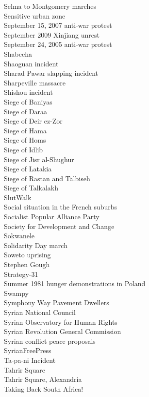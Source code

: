 Selma to Montgomery marches\\
Sensitive urban zone\\
September 15, 2007 anti-war protest\\
September 2009 Xinjiang unrest\\
September 24, 2005 anti-war protest\\
Shabeeha\\
Shaoguan incident\\
Sharad Pawar slapping incident\\
Sharpeville massacre\\
Shishou incident\\
Siege of Baniyas\\
Siege of Daraa\\
Siege of Deir ez-Zor\\
Siege of Hama\\
Siege of Homs\\
Siege of Idlib\\
Siege of Jisr al-Shughur\\
Siege of Latakia\\
Siege of Rastan and Talbiseh\\
Siege of Talkalakh\\
SlutWalk\\
Social situation in the French suburbs\\
Socialist Popular Alliance Party\\
Society for Development and Change\\
Sokwanele\\
Solidarity Day march\\
Soweto uprising\\
Stephen Gough\\
Strategy-31\\
Summer 1981 hunger demonstrations in Poland\\
Swampy\\
Symphony Way Pavement Dwellers\\
Syrian National Council\\
Syrian Observatory for Human Rights\\
Syrian Revolution General Commission\\
Syrian conflict peace proposals\\
SyrianFreePress\\
Ta-pa-ni Incident\\
Tahrir Square\\
Tahrir Square, Alexandria\\
Taking Back South Africa!\\
